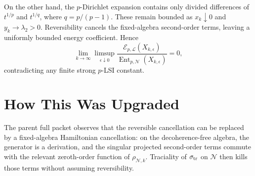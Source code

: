 \documentclass[11pt]{article}
\newcommand{\cE}{\mathcal E}
\newcommand{\cL}{\mathcal L}
\newcommand{\cN}{\mathcal N}
\newcommand{\Ent}{\operatorname{Ent}}
\begin{document}
On the other hand, the \(p\)-Dirichlet expansion contains only divided differences of \(t^{1/p}\) and \(t^{1/q}\), where \(q=p/(p-1)\). These remain bounded as \(x_k\downarrow0\) and \(y_k\to\lambda_2>0\). Reversibility cancels the fixed-algebra second-order terms, leaving a uniformly bounded energy coefficient. Hence
\[
  \lim_{k\to\infty}\limsup_{\epsilon\downarrow0}
  \frac{\cE_{p,\cL}(X_{k,\epsilon})}{\Ent_{p,\cN}(X_{k,\epsilon})}=0,
\]
contradicting any finite strong \(p\)-LSI constant.

\section*{How This Was Upgraded}

The parent full packet observes that the reversible cancellation can be replaced by a fixed-algebra Hamiltonian cancellation: on the decoherence-free algebra, the generator is a derivation, and the singular projected second-order terms commute with the relevant zeroth-order function of \(\rho_{\cN,k}\). Traciality of \(\sigma_{\rm tr}\) on \(\cN\) then kills those terms without assuming reversibility.
\end{document}
